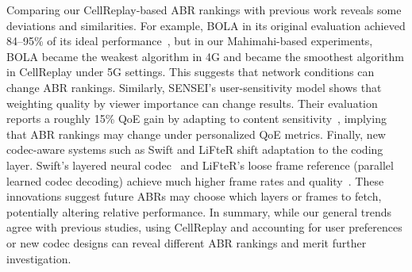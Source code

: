 Comparing our CellReplay‐based ABR rankings with previous work reveals some deviations and similarities. For example, BOLA in its original evaluation achieved 84–95\% of its ideal performance~\cite{bola-bola}, but in our Mahimahi-based experiments, BOLA became the weakest algorithm in 4G and became the smoothest algorithm in CellReplay under 5G settings. This suggests that network conditions can change ABR rankings. Similarly, SENSEI’s user-sensitivity model shows that weighting quality by viewer importance can change results. Their evaluation reports a roughly 15\% QoE gain by adapting to content sensitivity~\cite{sensei-nsdi21}, implying that ABR rankings may change under personalized QoE metrics. Finally, new codec-aware systems such as Swift and LiFteR shift adaptation to the coding layer. Swift’s layered neural codec~\cite{swift-nsdi22} and LiFteR's loose frame reference (parallel learned codec decoding) achieve much higher frame rates and quality~\cite{lifter-nsdi24}. These innovations suggest future ABRs may choose which layers or frames to fetch, potentially altering relative performance. In summary, while our general trends agree with previous studies, using CellReplay and accounting for user preferences or new codec designs can reveal different ABR rankings and merit further investigation.

